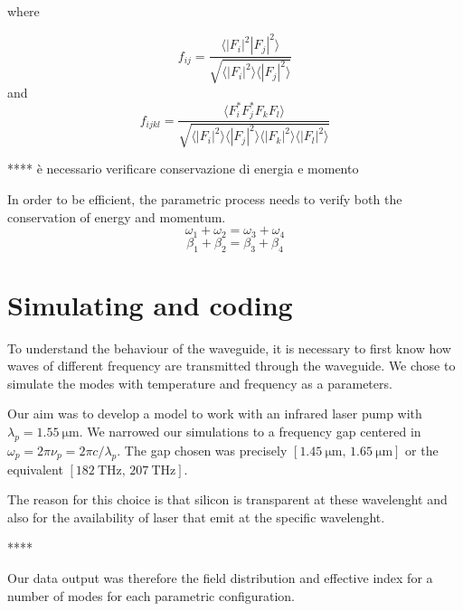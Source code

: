 \documentclass[12pt,a4paper,twoside]{article}
\begin{document}
where

\begin{equation}
	f_{ij} = \frac{\langle |F_i|^2 |F_j|^2 \rangle}{\sqrt{\langle |F_i|^2 \rangle\langle |F_j|^2 \rangle}}
\end{equation}
and
\begin{equation}
	f_{ijkl} = \frac{\langle F_i^* F_j^* F_k F_l \rangle}{\sqrt{\langle |F_i|^2 \rangle\langle |F_j|^2 \rangle\langle |F_k|^2 \rangle\langle |F_l|^2 \rangle}}
\end{equation}

\vspace{18pt}
****		è necessario verificare conservazione di energia e momento
\vspace{12pt}

In order to be efficient, the parametric process needs to verify both the conservation of energy and momentum.
\begin{equation}
\omega_1 + \omega_2 = \omega_3 + \omega_4
\end{equation}
\begin{equation}
\beta_1 + \beta_2 = \beta_3 + \beta_4
\end{equation}

\section{Simulating and coding}

To understand the behaviour of the waveguide, it is necessary to first know how waves of different frequency are transmitted through the waveguide.
We chose to simulate the modes with temperature and frequency as a parameters.

Our aim was to develop a model to work with an infrared laser pump with $\lambda_{p} = \SI{1.55}{\um}$.
We narrowed our simulations to a frequency gap centered in $\omega_p = 2\pi \nu_p = 2\pi c / \lambda_{p}$.
The gap chosen was precisely $[\SI{1.45}{\um} ,\, \SI{1.65}{\um}]$ or the equivalent $[\SI{182}{\THz} ,\, \SI{207}{\THz}]$.

The reason for this choice is that silicon is transparent at these wavelenght and also for the availability of laser that emit at the specific wavelenght.

\vspace{18pt}
****
\vspace{12pt}

Our data output was therefore the field distribution and effective index for a number of modes for each parametric configuration.
\end{document}
